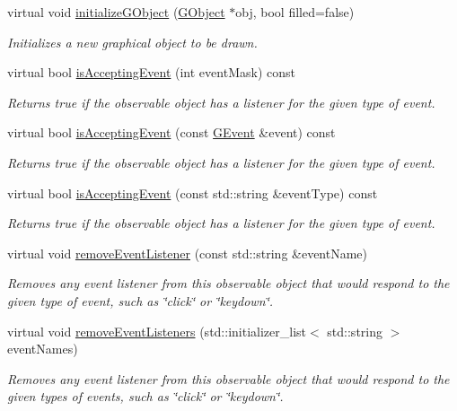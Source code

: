 \begin{DoxyCompactItemize}
virtual void \mbox{\hyperlink{classGDrawingSurface_a43e6bc951980da061ddc40407daee227}{initialize\+G\+Object}} (\mbox{\hyperlink{classGObject}{G\+Object}} $\ast$obj, bool filled=false)
\begin{DoxyCompactList}\small\item\em Initializes a new graphical object to be drawn. \end{DoxyCompactList}\item 
virtual bool \mbox{\hyperlink{classGObservable_aeec1adc19aa0f33de62390686ee1382c}{is\+Accepting\+Event}} (int event\+Mask) const
\begin{DoxyCompactList}\small\item\em Returns true if the observable object has a listener for the given type of event. \end{DoxyCompactList}\item 
virtual bool \mbox{\hyperlink{classGObservable_aa31c73145a29dcb92848a92e0cfaea41}{is\+Accepting\+Event}} (const \mbox{\hyperlink{classGEvent}{G\+Event}} \&event) const
\begin{DoxyCompactList}\small\item\em Returns true if the observable object has a listener for the given type of event. \end{DoxyCompactList}\item 
virtual bool \mbox{\hyperlink{classGObservable_a3b1c689267eda44e65a2213e7de38b23}{is\+Accepting\+Event}} (const std\+::string \&event\+Type) const
\begin{DoxyCompactList}\small\item\em Returns true if the observable object has a listener for the given type of event. \end{DoxyCompactList}\item 
virtual void \mbox{\hyperlink{classGObservable_acbcf1ed3a851ad8a3c17ef38d86b481d}{remove\+Event\+Listener}} (const std\+::string \&event\+Name)
\begin{DoxyCompactList}\small\item\em Removes any event listener from this observable object that would respond to the given type of event, such as \char`\"{}click\char`\"{} or \char`\"{}keydown\char`\"{}. \end{DoxyCompactList}\item 
virtual void \mbox{\hyperlink{classGObservable_af51cc35c29a1bd1908609d432decdbb6}{remove\+Event\+Listeners}} (std\+::initializer\+\_\+list$<$ std\+::string $>$ event\+Names)
\begin{DoxyCompactList}\small\item\em Removes any event listener from this observable object that would respond to the given types of events, such as \char`\"{}click\char`\"{} or \char`\"{}keydown\char`\"{}. \end{DoxyCompactList}\item 

\end{DoxyCompactItemize}
